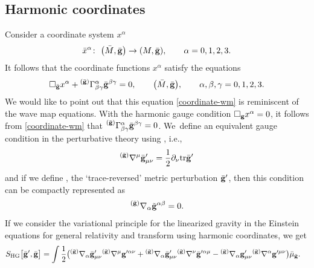 \documentclass[11pt]{article}
\numberwithin{equation}{section}
\def\ptl{\partial}%
\def\mbo#1{\boldsymbol{#1}}%
\def\grad{{\nabla}}%
\newcommand{\leftexp}[2]{{\vphantom{#2}}^{#1}{#2}}
\def\halb{\frac{1}{2}}%
\def \a{\alpha}
\def \b {\beta}
\renewcommand{\gg}{{\bf g}}
\newcommand{\bgg}{{\bar{\bf g}}}
\newcommand{\tgg}{{\tilde{\bf g}}}
\renewcommand{\a}{\alpha}
\renewcommand{\b}{\beta}
\numberwithin{equation}{section}
\begin{document}
\subsection*{Harmonic coordinates}
Consider a coordinate system $x^\a$
\begin{align*}
\bar{x}^\a \colon\ \bigl(\bar{M}, \bar{\gg}\bigr) \to (M, \bar{\gg}), \qquad \a = 0, 1, 2, 3.
\end{align*}
It follows that the coordinate functions $x^\a$ satisfy the equations
\begin{align} \label{coordinate-wm}
\square_{\bar{\gg}} x^\a + \leftexp{(\bar{\gg})}{\Gamma}_{\b \gamma}^\a \bar{\gg}^{\b \gamma} =0, \qquad \bigl(\bar{M}, \bar{\gg}\bigr), \qquad \a, \b, \gamma = 0,1, 2, 3.
\end{align}
We would like to point out that this equation \eqref{coordinate-wm} is reminiscent of the wave map equations. With the harmonic gauge condition $\square_\gg x^\a =0$, it follows from \eqref{coordinate-wm} that $ \leftexp{(\bar{\gg})}{\Gamma}_{\b \gamma}^\a \bar{\gg}^{\b \gamma} =0 $. We~define an equivalent gauge condition in the perturbative theory using \smash{$D_{\mbo{\gamma}_s} \cdot \leftexp{(\bar{\gg})}{\Gamma}_{\b \gamma}^\a \bar{\gg}^{\b \gamma}$}, i.e.,
\begin{align} \label{harmonic-gauge-condition}
\leftexp{(\bar{\gg})}{\grad}^ \mu \bgg'_{\mu \nu} = \halb \ptl_ \nu {\rm tr} \bgg'
\end{align}
and if we define \smash{$\tilde{\gg}' := \bar{\gg}'- \halb \bar{\gg}^{\a \b} \bar{\gg}'_{\a \b}$}, the `trace-reversed' metric perturbation $\bar{\gg}'$, then this condition can be compactly represented as
\begin{align*} %
\leftexp{(\bgg)}{\grad}_\a \tgg^{\a \b} =0.
\end{align*}
 If we consider the variational principle for the linearized gravity in the Einstein equations for general relativity %
and transform using harmonic coordinates, we get
\begin{align*} %
S_{{\rm HG}}\bigl[\bar{\gg}', \bar{\gg}\bigr] &{}= \int \halb \bigl(\leftexp{(\bar{\gg})}{\grad}_\a \bar{\gg}'_{\mu \nu} \leftexp{(\bar{\gg})}{\grad}^\mu \gg'^{\a \nu} + \leftexp{(\bar{\gg})}{\grad}_\a \bar{\gg}'_{\mu \nu} \leftexp{(\bar{\gg})}{\grad}^\nu \bar{\gg}'^{\a \mu}
 - \leftexp{(\bar{\gg})}{\grad}_\a \gg'_{\mu \nu} \leftexp{(\bar{\gg})}{\grad}^\a \gg'^{\mu \nu}
\bigr) \bar{\mu}_{\bar{\gg}}.
\end{align*}
\end{document}
